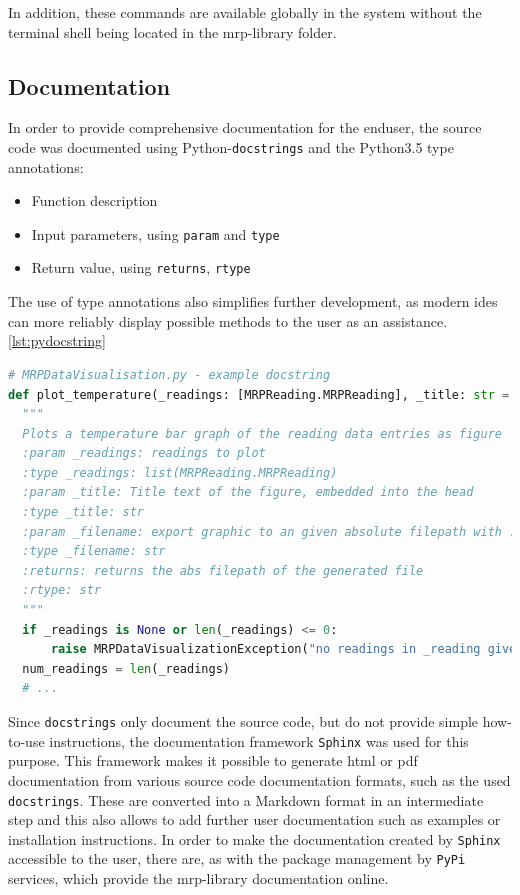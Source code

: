 In addition, these commands are available globally in the system without
the terminal shell being located in the \gls{mrp}-library folder.

\hypertarget{documentation}{%
\subsection{Documentation}\label{documentation}}

In order to provide comprehensive documentation for the enduser, the
source code was documented using
Python-\passthrough{\lstinline!docstrings!}\cite{PythonDocstringReference}
and the Python3.5 type annotations:

\begin{itemize}
\tightlist
\item
  Function description
\item
  Input parameters, using \passthrough{\lstinline!param!} and
  \passthrough{\lstinline!type!}
\item
  Return value, using \passthrough{\lstinline!returns!},
  \passthrough{\lstinline!rtype!}
\end{itemize}

The use of type annotations also simplifies further development, as
modern \gls{ide}s can more reliably display possible methods to the user
as an assistance. \ref{lst:pydocstring}

\begin{lstlisting}[language=Python, caption={Documentation using Python docstring example}, label=lst:pydocstring]
# MRPDataVisualisation.py - example docstring
def plot_temperature(_readings: [MRPReading.MRPReading], _title: str = '', _filename: str = None, _unit: str = "degree C") -> str:
  """
  Plots a temperature bar graph of the reading data entries as figure
  :param _readings: readings to plot
  :type _readings: list(MRPReading.MRPReading)
  :param _title: Title text of the figure, embedded into the head
  :type _title: str
  :param _filename: export graphic to an given absolute filepath with .png
  :type _filename: str
  :returns: returns the abs filepath of the generated file
  :rtype: str
  """
  if _readings is None or len(_readings) <= 0:
      raise MRPDataVisualizationException("no readings in _reading given")
  num_readings = len(_readings)
  # ...
\end{lstlisting}

Since \passthrough{\lstinline!docstrings!} only document the source
code, but do not provide simple how-to-use instructions, the
documentation framework
\passthrough{\lstinline!Sphinx!}\cite{SphinxDocumentation} was used
for this purpose. This framework makes it possible to generate
\gls{html} or \gls{pdf} documentation from various source code
documentation formats, such as the used
\passthrough{\lstinline!docstrings!}. These are converted into a
Markdown format in an intermediate step and this also allows to add
further user documentation such as examples or installation
instructions. In order to make the documentation created by
\passthrough{\lstinline!Sphinx!} accessible to the user, there are, as
with the package management by \passthrough{\lstinline!PyPi!} services,
which provide the \gls{mrp}-library documentation online.


